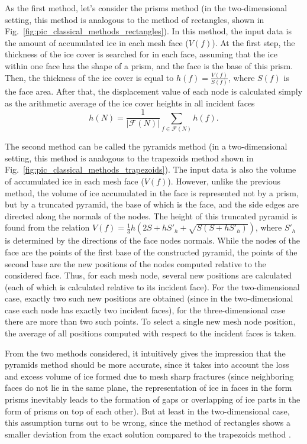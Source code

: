 As the first method, let's consider the prisms method (in the two-dimensional setting, this method is analogous to the method of rectangles, shown in Fig.~\ref{fig:pic_classical_methods_rectangles}).
In this method, the input data is the amount of accumulated ice in each mesh face ($V(f)$).
At the first step, the thickness of the ice cover is searched for in each face, assuming that the ice within one face has the shape of a prism, and the face is the base of this prism.
Then, the thickness of the ice cover is equal to $h(f) =
\frac{V(f)}{S(f)}$, where $S(f)$ is the face area.
After that, the displacement value of each node is calculated simply
as the arithmetic average of the ice cover heights in all incident
faces
\begin{equation*}
h(N) = \frac{1}{|\mathscr{F}(N)|} \sum_{f \in \mathscr{F}(N)}{h(f)}.
\end{equation*}

The second method can be called the pyramids method (in a two-dimensional setting, this method is analogous to the trapezoids method shown in Fig.~\ref{fig:pic_classical_methods_trapezoids}).
The input data is also the volume of accumulated ice in each mesh face ($V(f)$).
However, unlike the previous method, the volume of ice accumulated in the face is represented not by a prism, but by a truncated pyramid, the base of which is the face, and the side edges are directed along the normals of the nodes.
The height of this truncated pyramid is found from the relation $V(f) = \frac{1}{3} h (2S + hS'_h + \sqrt{S(S + hS'_h)})$, where $S'_h$ is determined by the directions of the face nodes normals.
While the nodes of the face are the points of the first base of the constructed pyramid, the points of the second base are the new positions of the nodes computed relative to the considered face.
Thus, for each mesh node, several new positions are calculated (each of which is calculated relative to its incident face).
For the two-dimensional case, exactly two such new positions are obtained (since in the two-dimensional case each node has exactly two incident faces), for the three-dimensional case there are more than two such points.
To select a single new mesh node position, the average of all positions computed with respect to the incident faces is taken.

From the two methods considered, it intuitively gives the impression that the pyramids method should be more accurate, since it takes into account the loss and excess volume of ice formed due to mesh sharp fractures (since neighboring faces do not lie in the same plane, the representation of ice in faces in the form prisms inevitably leads to the formation of gaps or overlapping of ice parts in the form of prisms on top of each other).
But at least in the two-dimensional case, this assumption turns out to be wrong, since the method of rectangles shows a smaller deviation from the exact solution compared to the trapezoids method \cite{Rybakov_2D}.

